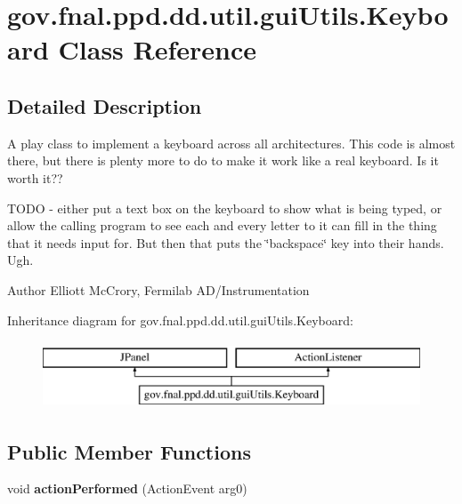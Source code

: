 \hypertarget{classgov_1_1fnal_1_1ppd_1_1dd_1_1util_1_1guiUtils_1_1Keyboard}{\section{gov.\-fnal.\-ppd.\-dd.\-util.\-gui\-Utils.\-Keyboard Class Reference}
\label{classgov_1_1fnal_1_1ppd_1_1dd_1_1util_1_1guiUtils_1_1Keyboard}
}


\subsection{Detailed Description}
A play class to implement a keyboard across all architectures. This code is almost there, but there is plenty more to do to make it work like a real keyboard. Is it worth it??

T\-O\-D\-O -\/ either put a text box on the keyboard to show what is being typed, or allow the calling program to see each and every letter to it can fill in the thing that it needs input for. But then that puts the \char`\"{}backspace\char`\"{} key into their hands. Ugh.

\begin{DoxyAuthor}{Author}
Elliott Mc\-Crory, Fermilab A\-D/\-Instrumentation 
\end{DoxyAuthor}
Inheritance diagram for gov.\-fnal.\-ppd.\-dd.\-util.\-gui\-Utils.\-Keyboard\-:\begin{figure}[H]
\begin{center}
\leavevmode
\includegraphics[height=2.000000cm]{classgov_1_1fnal_1_1ppd_1_1dd_1_1util_1_1guiUtils_1_1Keyboard}
\end{center}
\end{figure}
\subsection*{Public Member Functions}
\begin{DoxyCompactItemize}
\item 
\hypertarget{classgov_1_1fnal_1_1ppd_1_1dd_1_1util_1_1guiUtils_1_1Keyboard_ae3c84f19ec94220249a2c0b03be735c3}{void {\bfseries action\-Performed} (Action\-Event arg0)}\label{classgov_1_1fnal_1_1ppd_1_1dd_1_1util_1_1guiUtils_1_1Keyboard_ae3c84f19ec94220249a2c0b03be735c3}

\end{DoxyCompactItemize}
